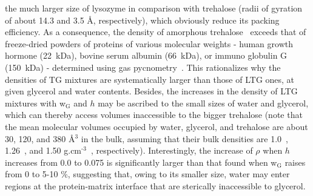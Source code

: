 \documentclass[journal=jpcbfk,manuscript=article]{achemso}
\begin{document}
\begin{singlespacing}
the much larger size of lysozyme in comparison with trehalose (radii of gyration of about 14.3 and 3.5 \AA \/, respectively), 
which obviously reduce its packing efficiency. As a consequence, 
the density of amorphous trehalose~\cite{Imamura2008} exceeds that of freeze-dried powders of proteins of various 
molecular weights - human growth hormone (22~kDa), bovine serum albumin (66~kDa), or immuno globulin G (150~kDa) - 
determined using gas pycnometry~\cite{Kikuchi2011}. This rationalizes why the densities of TG mixtures are systematically larger 
than those of LTG ones, at given glycerol and water contents. Besides, the increases in the density of LTG mixtures with 
w$_{\textrm{G}}$ and $h$ may be ascribed to the small sizes of water and glycerol, which can thereby access volumes 
inaccessible to the bigger trehalose (note that the mean molecular volumes occupied by water, glycerol, and trehalose are 
about 30, 120, and 380 \AA \/$^{\textrm{3}}$ in the bulk, assuming that their bulk densities are 1.0~\cite{Kell1967}, 1.26~\cite{Bosart1928}, and 
1.50 g.cm$^{\textrm{-3}}$~\cite{Imamura2008}, respectively). Interestingly, the increase of $\rho$ when $h$ increases from 0.0 to 0.075 is 
significantly larger than that found when w$_{\textrm{G}}$ raises from 0 to 5-10 \%, suggesting that, owing to its smaller size, 
water may enter regions at the protein-matrix interface that are sterically inaccessible to glycerol.\\


\end{singlespacing}
\end{document}
